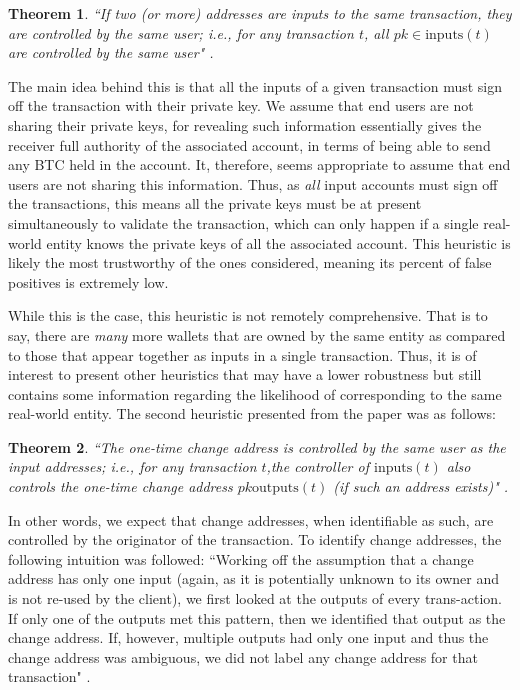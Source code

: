 \documentclass{article}
\newtheorem{theorem}{Theorem}[section]
\begin{document}
\begin{theorem}
``If two (or more) addresses are inputs to the same transaction, they are controlled by the same user; i.e., for any transaction $t$, all $pk\in\text{inputs}(t)$  are controlled by the same user" \cite{fistful}.
\end{theorem}

The main idea behind this is that all the inputs of a given transaction must sign off the transaction with their private key. We assume that end users are not sharing their private keys, for revealing such information essentially gives the receiver full authority of the associated account, in terms of being able to send any BTC held in the account. It, therefore, seems appropriate to assume that end users are not sharing this information. Thus, as \textit{all} input accounts must sign off the transactions, this means all the private keys must be at present simultaneously to validate the transaction, which can only happen if a single real-world entity knows the private keys of all the associated account. This heuristic is likely the most trustworthy of the ones considered, meaning its percent of false positives is extremely low. 

While this is the case, this heuristic is not remotely comprehensive. That is to say, there are \textit{many} more wallets that are owned by the same entity as compared to those that appear together as inputs in a single transaction. Thus, it is of interest to present other heuristics that may have a lower robustness but still contains some information regarding the likelihood of corresponding to the same real-world entity. The second heuristic presented from the paper was as follows:

\begin{theorem}
``The  one-time  change  address  is  controlled  by the same user as the input addresses; i.e., for any transaction $t$,the controller of $\text{inputs}(t)$ also controls the one-time change address $pk \text{outputs}(t)$ (if such an address exists)" \cite{fistful}.
\end{theorem}

In other words, we expect that change addresses, when identifiable as such, are controlled by the originator of the transaction. To identify change addresses, the following intuition was followed: ``Working off the assumption that a change address has only one input (again,  as it is potentially unknown to its owner and is not re-used by the client), we first looked at the outputs of every trans-action. If only one of the outputs met this pattern, then we identified that output as the change address. If, however, multiple outputs had only one input and thus the change address was ambiguous, we did not label any change address for that transaction" \cite{fistful}.
\end{document}
